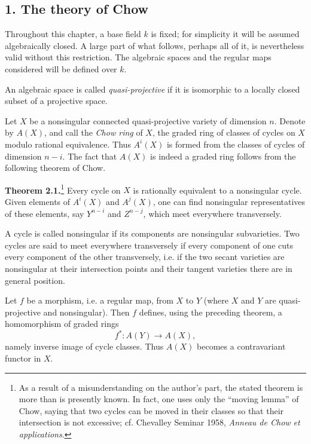 \subsection*{1. The theory of Chow}

Throughout this chapter, a base field $k$ is fixed; for simplicity it will be assumed algebraically closed. A large part of what follows, perhaps all of it, is nevertheless valid without this restriction. The algebraic spaces and the regular maps considered will be defined over $k$.

An algebraic space is called \emph{quasi-projective} if it is isomorphic to a locally closed subset of a projective space.

Let $X$ be a nonsingular connected quasi-projective variety of dimension $n$. Denote by $A(X)$, and call the \emph{Chow ring} of $X$, the graded ring of classes of cycles on $X$ modulo rational equivalence. Thus $A^i(X)$ is formed from the classes of cycles of dimension $n-i$. The fact that $A(X)$ is indeed a graded ring follows from the following theorem of Chow.

\textbf{Theorem 2.1.}\footnote{As a result of a misunderstanding on the author's part, the stated theorem is more than is presently known. In fact, one uses only the ``moving lemma'' of Chow, saying that two cycles can be moved in their classes so that their intersection is not excessive; cf. Chevalley Seminar 1958, \emph{Anneau de Chow et applications}.} Every cycle on $X$ is rationally equivalent to a nonsingular cycle. Given elements of $A^i(X)$ and $A^j(X)$, one can find nonsingular representatives of these elements, say $Y^{n-i}$ and $Z^{n-j}$, which meet everywhere transversely.

A cycle is called nonsingular if its components are nonsingular subvarieties. Two cycles are said to meet everywhere transversely if every component of one cuts every component of the other transversely, i.e. if the two secant varieties are nonsingular at their intersection points and their tangent varieties there are in general position.

Let $f$ be a morphism, i.e. a regular map, from $X$ to $Y$ (where $X$ and $Y$ are quasi-projective and nonsingular). Then $f$ defines, using the preceding theorem, a homomorphism of graded rings
\begin{equation}\tag{2.1}
f^*:A(Y)\longrightarrow A(X),
\end{equation}
namely inverse image of cycle classes. Thus $A(X)$ becomes a contravariant functor in $X$.

